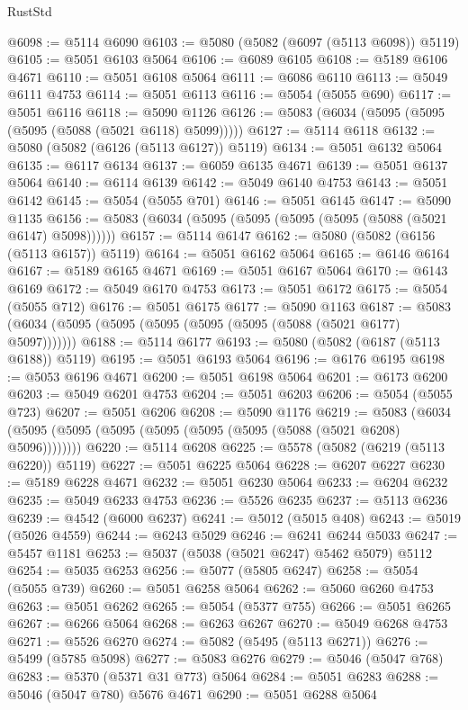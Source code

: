 \begin{lexlean}{RustStd}
\begin{coremodule}
@6098 := @5114 @6090
@6103 := @5080 (@5082 (@6097 (@5113 @6098)) @5119)
@6105 := @5051 @6103 @5064
@6106 := @6089 @6105
@6108 := @5189 @6106 @4671
@6110 := @5051 @6108 @5064
@6111 := @6086 @6110
@6113 := @5049 @6111 @4753
@6114 := @5051 @6113
@6116 := @5054 (@5055 @690)
@6117 := @5051 @6116
@6118 := @5090 @1126
@6126 := @5083 (@6034 (@5095 (@5095 (@5095 (@5088 (@5021 @6118) @5099)))))
@6127 := @5114 @6118
@6132 := @5080 (@5082 (@6126 (@5113 @6127)) @5119)
@6134 := @5051 @6132 @5064
@6135 := @6117 @6134
@6137 := @6059 @6135 @4671
@6139 := @5051 @6137 @5064
@6140 := @6114 @6139
@6142 := @5049 @6140 @4753
@6143 := @5051 @6142
@6145 := @5054 (@5055 @701)
@6146 := @5051 @6145
@6147 := @5090 @1135
@6156 := @5083 (@6034 (@5095 (@5095 (@5095 (@5095 (@5088 (@5021 @6147) @5098))))))
@6157 := @5114 @6147
@6162 := @5080 (@5082 (@6156 (@5113 @6157)) @5119)
@6164 := @5051 @6162 @5064
@6165 := @6146 @6164
@6167 := @5189 @6165 @4671
@6169 := @5051 @6167 @5064
@6170 := @6143 @6169
@6172 := @5049 @6170 @4753
@6173 := @5051 @6172
@6175 := @5054 (@5055 @712)
@6176 := @5051 @6175
@6177 := @5090 @1163
@6187 := @5083 (@6034 (@5095 (@5095 (@5095 (@5095 (@5095 (@5088 (@5021 @6177) @5097)))))))
@6188 := @5114 @6177
@6193 := @5080 (@5082 (@6187 (@5113 @6188)) @5119)
@6195 := @5051 @6193 @5064
@6196 := @6176 @6195
@6198 := @5053 @6196 @4671
@6200 := @5051 @6198 @5064
@6201 := @6173 @6200
@6203 := @5049 @6201 @4753
@6204 := @5051 @6203
@6206 := @5054 (@5055 @723)
@6207 := @5051 @6206
@6208 := @5090 @1176
@6219 := @5083 (@6034 (@5095 (@5095 (@5095 (@5095 (@5095 (@5095 (@5088 (@5021 @6208) @5096))))))))
@6220 := @5114 @6208
@6225 := @5578 (@5082 (@6219 (@5113 @6220)) @5119)
@6227 := @5051 @6225 @5064
@6228 := @6207 @6227
@6230 := @5189 @6228 @4671
@6232 := @5051 @6230 @5064
@6233 := @6204 @6232
@6235 := @5049 @6233 @4753
@6236 := @5526 @6235
@6237 := @5113 @6236
@6239 := @4542 (@6000 @6237)
@6241 := @5012 (@5015 @408)
@6243 := @5019 (@5026 @4559)
@6244 := @6243 @5029
@6246 := @6241 @6244 @5033
@6247 := @5457 @1181
@6253 := @5037 (@5038 (@5021 @6247) @5462 @5079) @5112
@6254 := @5035 @6253
@6256 := @5077 (@5805 @6247)
@6258 := @5054 (@5055 @739)
@6260 := @5051 @6258 @5064
@6262 := @5060 @6260 @4753
@6263 := @5051 @6262
@6265 := @5054 (@5377 @755)
@6266 := @5051 @6265
@6267 := @6266 @5064
@6268 := @6263 @6267
@6270 := @5049 @6268 @4753
@6271 := @5526 @6270
@6274 := @5082 (@5495 (@5113 @6271))
@6276 := @5499 (@5785 @5098)
@6277 := @5083 @6276
@6279 := @5046 (@5047 @768)
@6283 := @5370 (@5371 @31 @773) @5064
@6284 := @5051 @6283
@6288 := @5046 (@5047 @780) @5676 @4671
@6290 := @5051 @6288 @5064

\end{coremodule}
\end{lexlean}
